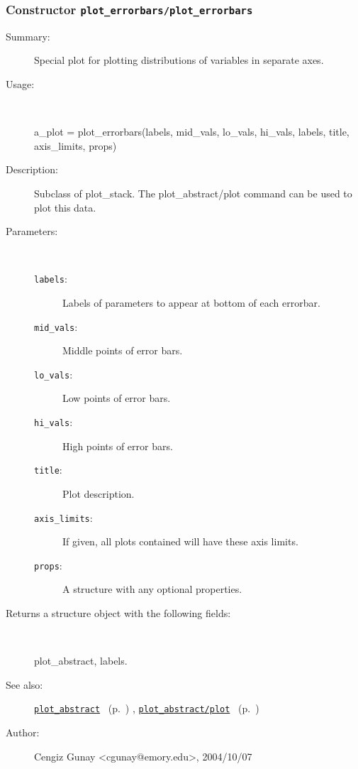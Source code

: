 \subsubsection[Constructor \texttt{plot\_errorbars}]{Constructor \texttt{plot\_errorbars/plot\_errorbars}}%
%
\label{ref_plot_errorbars__plot_errorbars}%
\hypertarget{ref_plot_errorbars__plot_errorbars}{}%
\begin{description}
\item[Summary:]Special plot for plotting distributions of variables in separate axes.
%
\item[Usage:]~%
\begin{lyxcode}%
a\_plot = plot\_errorbars(labels, mid\_vals, lo\_vals, hi\_vals, labels, 
			 title, axis\_limits, props)
%
\end{lyxcode}%
%
\item[Description:]%
Subclass of plot\_stack. The plot\_abstract/plot command can be used to
 plot this data.
\item[Parameters:]~
\begin{description}%
\item[\texttt{labels}:]
 Labels of parameters to appear at bottom of each errorbar.
\item[\texttt{mid\_vals}:]
 Middle points of error bars.
\item[\texttt{lo\_vals}:]
 Low points of error bars.
\item[\texttt{hi\_vals}:]
 High points of error bars.
\item[\texttt{title}:]
 Plot description.
\item[\texttt{axis\_limits}:]
 If given, all plots contained will have these axis limits.
\item[\texttt{props}:]
 A structure with any optional properties.
\end{description}%
%
\item[Returns a structure object with the following fields:]~

	plot\_abstract, labels.
%
%
\item[See also:]%
\hyperlink{ref_plot_abstract}{\texttt{plot\_abstract}}%
\ (p.~\pageref{ref_plot_abstract})%
%
, \hyperlink{ref_plot_abstract__plot}{\texttt{plot\_abstract/plot}}%
\ (p.~\pageref{ref_plot_abstract__plot})%
%
%
\item[Author:]%
Cengiz Gunay <cgunay@emory.edu>, 2004/10/07%
\end{description}
\methodline%
